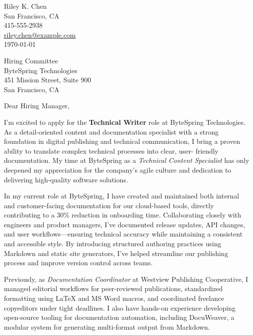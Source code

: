 \documentclass[12pt]{article}
\begin{document}

\begin{flushleft}
Riley K. Chen\\San Francisco, CA\\415-555-2938\\\href{mailto:riley.chen@example.com}{riley.chen@example.com}\\  \today
\end{flushleft}

\vspace{0.5cm}

\begin{flushleft}
  Hiring Committee\\  ByteSpring Technologies\\  451 Mission Street, Suite 900\\  San Francisco, CA\\\end{flushleft}
\vspace{1cm}

\raggedright
  Dear Hiring Manager,%

I'm excited to apply for the \textbf{Technical Writer} role at ByteSpring
Technologies. As a detail-oriented content and documentation specialist with a
strong foundation in digital publishing and technical communication, I bring a
proven ability to translate complex technical processes into clear, user-
friendly documentation. My time at ByteSpring as a \textsl{Technical Content
Specialist} has only deepened my appreciation for the company’s agile culture
and dedication to delivering high-quality software solutions.

In my current role at ByteSpring, I have created and maintained both internal
and customer-facing documentation for our cloud-based tools, directly
contributing to a 30\% reduction in onboarding time. Collaborating closely with
engineers and product managers, I’ve documented release updates, API changes,
and user workflows—ensuring technical accuracy while maintaining a consistent
and accessible style. By introducing structured authoring practices using
Markdown and static site generators, I’ve helped streamline our publishing
process and improve version control across teams.

Previously, as \textsl{Documentation Coordinator} at Westview Publishing
Cooperative, I managed editorial workflows for peer-reviewed publications,
standardized formatting using LaTeX and MS Word macros, and coordinated
freelance copyeditors under tight deadlines. I also have hands-on experience
developing open-source tooling for documentation automation, including
DocuWeaver, a modular system for generating multi-format output from Markdown.
\end{document}
